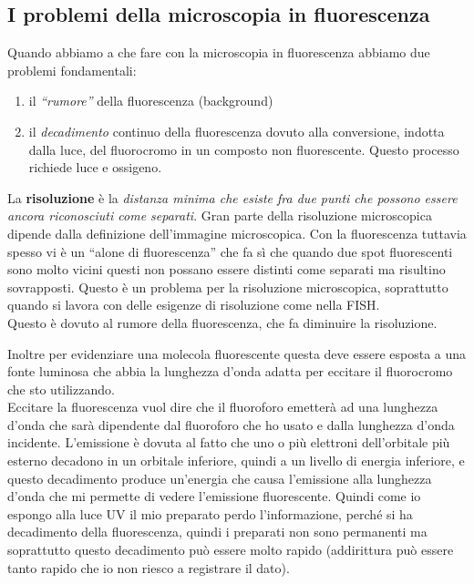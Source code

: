 \documentclass[11pt]{book}
\begin{document}
\subsection{I problemi della microscopia in fluorescenza}
Quando abbiamo a che fare con la microscopia in fluorescenza abbiamo due problemi fondamentali:
\begin{enumerate}
\item il \emph{``rumore''} della fluorescenza (background)
\item il \emph{decadimento} continuo della fluorescenza dovuto alla conversione, indotta dalla luce, del fluorocromo in un composto non fluorescente. Questo processo richiede luce e ossigeno.
\end{enumerate}

La \textbf{risoluzione} è la \emph{distanza minima che esiste fra due punti che possono essere ancora riconosciuti come separati}. Gran parte della risoluzione microscopica dipende dalla definizione dell’immagine microscopica. Con la fluorescenza tuttavia spesso vi è un ``alone di fluorescenza'' che fa sì che quando due spot fluorescenti sono molto vicini questi non possano essere distinti come separati ma risultino sovrapposti. Questo è un problema per la risoluzione microscopica, soprattutto quando si lavora con delle esigenze di risoluzione come nella FISH.\\ Questo è dovuto al rumore della fluorescenza, che fa diminuire la risoluzione.

Inoltre per evidenziare una molecola fluorescente questa deve essere esposta a una fonte luminosa che abbia la lunghezza d'onda adatta per eccitare il fluorocromo che sto utilizzando.\\
Eccitare la fluorescenza vuol dire che il fluoroforo emetterà ad una lunghezza d’onda che sarà dipendente dal fluoroforo che ho usato e dalla lunghezza d’onda incidente. L’emissione è dovuta al fatto che uno o più elettroni dell’orbitale più esterno decadono in un orbitale inferiore, quindi a un livello di energia inferiore, e questo decadimento produce un'energia che causa l’emissione alla lunghezza d’onda che mi permette di vedere l’emissione fluorescente. Quindi come io espongo alla luce UV il mio preparato perdo l’informazione, perché si ha decadimento della fluorescenza, quindi i preparati non sono permanenti ma soprattutto questo decadimento può essere molto rapido (addirittura può essere tanto rapido che io non riesco a registrare il dato).
\end{document}
